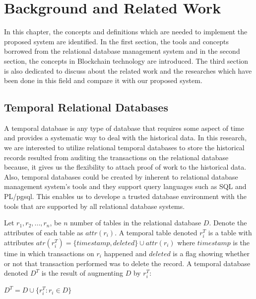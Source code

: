 \chapter{Background and Related Work} \label{ch:background}
	In this chapter, the concepts and definitions which are needed to implement the proposed system are identified. In the first section, the tools and concepts borrowed from the relational database management system and in the second section, the concepts in Blockchain technology are introduced. The third section is also dedicated to discuss about the related work and the researches which have been done in this field and compare it with our proposed system.

	\section{Temporal Relational Databases} \label{sec:temporal database}
		 A temporal database is any type of database that requires some aspect of time \cite {elmasri2010fundamentalsofdatabase} and provides a systematic way to deal with the historical data. In this research, we are interested to utilize relational temporal databases to store the historical records resulted from auditing the transactions on the relational database because, it gives us the flexibility to attach proof of work to the historical data. Also, temporal databases could be created by inherent to relational database management system's tools and they support query languages such as SQL and PL/pgsql. This enables us to develope a trusted database environment with the tools that are supported by all relational database systems. 
		\begin{defn}
			Let $r_1, r_2, ... , r_n$, be $n$ number of tables in the relational database $D$. Denote the attributes of each table as $attr(r_i)$. A temporal table denoted $r_i^T$ is a table with attributes $atr(r_i^T) = \{timestamp, deleted\}\cup attr(r_i)$ where $timestamp$ is the time in which transactions on $r_i$ happened and $deleted$ is a flag showing whether or not that transaction performed was to delete the record. A temporal database denoted $D^T$ is the result of augmenting $D$ by $r_i^T$:

			\begin{center}
				{$D^T = D \cup \{{r_i^T}: r_i \in D \}$}
			\end{center}
		\label{dfn:temporal_database}
		\end {defn}

